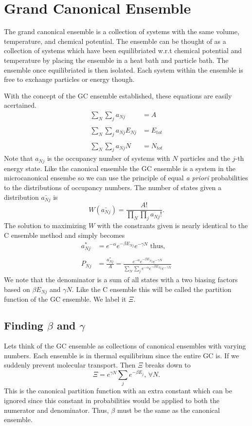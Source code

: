 \section{Grand Canonical Ensemble}
The grand canonical ensemble is a collection of systems with the same volume,
temperature, and chemical potential. The ensemble can be thought of as a
collection of systems which have been equilibriated w.r.t chemical potential and
temperature by placing the ensemble in a heat bath and particle bath. The
ensemble once equilibriated is then isolated. Each system within the ensemble is
free to exchange particles or energy though.

With the concept of the GC ensemble established, these equations are easily
acertained.
\begin{align*}
	\sum_N \sum_j{a_{Nj}} & = A \\\\
	\sum_N \sum_j{a_{Nj}E_{Nj}} & = E_{tot} \\\\
	\sum_N \sum_j{a_{Nj}N} & = N_{tot}
\end{align*}
Note that $a_{Nj}$ is the occupancy number of systems with $N$ particles and the
$j$-th energy state. Like the canonical ensemble the GC ensemble is a system in
the microcanonical ensembe so we can use the principle of equal \textit{a
priori} probabilities to the distributions of occupancy numbers. The number of
states given a distribution $\bar{a_{Nj}}$ is
\begin{equation*}
	W(\bar{a_{Nj}}) = \frac{A!}{\prod_N{}\prod_j{a_{Nj}!}}.
\end{equation*}
The solution to maximizing $W$ with the constrants given is nearly identical to
the C ensemble method and simply becomes
\begin{align*}
	a_{Nj}^{*}&= e^{-\alpha}e^{-\beta E_{Nj}}e^{-\gamma N} \text{ thus,} \\\\
	P_{Nj}&= \frac{a_{Nj}^*}{A} = \frac{e^{-\alpha}e^{-\beta E_{Nj}}e^{-\gamma
	N}}{\sum_N \sum_j{e^{-\alpha}e^{-\beta E_{Nj}}e^{-\gamma N}}}
\end{align*}
We note that the denominator is a sum of all states with a two biasing factors
based on $\beta E_{Nj}$ and $\gamma N$. Like the C ensemble this will be called
the partition function of the GC ensemble. We label it $\Xi$.

\subsection{Finding $\beta$ and $\gamma$}
Lets think of the GC ensemble as collections of canonical ensembles with varying
numbers. Each ensemble is in thermal equilibrium since the entire GC is. If we
suddenly prevent molecular transport. Then $\Xi$ breaks down to
\begin{equation*}
	\Xi = e^{\gamma N} \sum_j{ e^{-\beta E_j}} \text{, } \forall N.
\end{equation*}
This is the canonical partition function with an extra constant which can be
ignored since this constant in probabilities would be applied to both the
numerator and denominator. Thus, $\beta$ must be the same as the canonical
ensemble.

